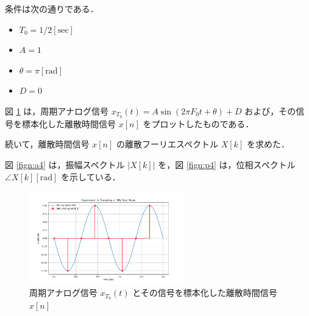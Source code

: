 \documentclass[fleqn, a4paper. 12pt]{jsarticle}
\begin{document}
  条件は次の通りである．

  \begin{itemize}
    \item $T_0 = 1/2 [\mathrm{sec}]$
    \item $A = 1$
    \item $\theta = \pi [\mathrm{rad}]$
    \item $D = 0$
  \end{itemize}

  図 \ref{fig:s4} は，周期アナログ信号 $x_{T_0}(t)=A \sin \left(2 \pi F_0 t+\theta\right)+D$ および，その信号を標本化した離散時間信号 $x[n]$ をプロットしたものである．

  続いて，離散時間信号 $x[n]$ の離散フーリエスペクトル $X[k]$ を求めた．

  図 \ref{fign:a4} は，振幅スペクトル $|X[k]|$ を，図 \ref{fign:p4} は，位相スペクトル $\angle X[k][\mathrm{rad}]$ を示している．

  \begin{figure}[!h]
    \centering
    \includegraphics[width=0.6\textwidth]{sampling_experiment_4.png}
    \caption{周期アナログ信号 $x_{T_0}(t)$ とその信号を標本化した離散時間信号 $x[n]$}
    \label{fig:s4}
  \end{figure}
\end{document}
